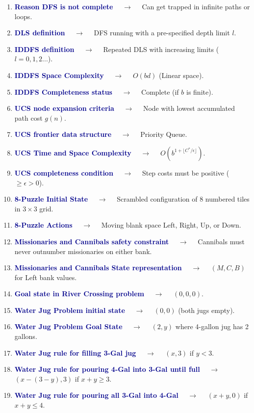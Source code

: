 \documentclass[11pt,a4paper]{article}
\begin{document}
\begin{enumerate}[label=\arabic*., leftmargin=*, labelsep=0.8em, itemsep=0.35em, parsep=0.1em, topsep=0.2em]
  \item \textcolor{darkblue}{\textbf{Reason DFS is not complete}} $\quad\to\quad$ Can get trapped in infinite paths or loops.
  \item \textcolor{darkblue}{\textbf{DLS definition}} $\quad\to\quad$ DFS running with a pre-specified depth limit $l$.
  \item \textcolor{darkblue}{\textbf{IDDFS definition}} $\quad\to\quad$ Repeated DLS with increasing limits ($l = 0, 1, 2...$).
  \item \textcolor{darkblue}{\textbf{IDDFS Space Complexity}} $\quad\to\quad$ $O(bd)$ (Linear space).
  \item \textcolor{darkblue}{\textbf{IDDFS Completeness status}} $\quad\to\quad$ Complete (if $b$ is finite).
  \item \textcolor{darkblue}{\textbf{UCS node expansion criteria}} $\quad\to\quad$ Node with lowest accumulated path cost $g(n)$.
  \item \textcolor{darkblue}{\textbf{UCS frontier data structure}} $\quad\to\quad$ Priority Queue.
  \item \textcolor{darkblue}{\textbf{UCS Time and Space Complexity}} $\quad\to\quad$ $O(b^{1 + \lfloor C^*/\epsilon \rfloor})$.
  \item \textcolor{darkblue}{\textbf{UCS completeness condition}} $\quad\to\quad$ Step costs must be positive ($\ge \epsilon > 0$).
  \item \textcolor{darkblue}{\textbf{8-Puzzle Initial State}} $\quad\to\quad$ Scrambled configuration of 8 numbered tiles in $3\times3$ grid.
  \item \textcolor{darkblue}{\textbf{8-Puzzle Actions}} $\quad\to\quad$ Moving blank space Left, Right, Up, or Down.
  \item \textcolor{darkblue}{\textbf{Missionaries and Cannibals safety constraint}} $\quad\to\quad$ Cannibals must never outnumber missionaries on either bank.
  \item \textcolor{darkblue}{\textbf{Missionaries and Cannibals State representation}} $\quad\to\quad$ $(M, C, B)$ for Left bank values.
  \item \textcolor{darkblue}{\textbf{Goal state in River Crossing problem}} $\quad\to\quad$ $(0, 0, 0)$.
  \item \textcolor{darkblue}{\textbf{Water Jug Problem initial state}} $\quad\to\quad$ $(0, 0)$ (both jugs empty).
  \item \textcolor{darkblue}{\textbf{Water Jug Problem Goal State}} $\quad\to\quad$ $(2, y)$ where 4-gallon jug has 2 gallons.
  \item \textcolor{darkblue}{\textbf{Water Jug rule for filling 3-Gal jug}} $\quad\to\quad$ $(x, 3)$ if $y < 3$.
  \item \textcolor{darkblue}{\textbf{Water Jug rule for pouring 4-Gal into 3-Gal until full}} $\quad\to\quad$ $(x - (3 - y), 3)$ if $x+y \ge 3$.
  \item \textcolor{darkblue}{\textbf{Water Jug rule for pouring all 3-Gal into 4-Gal}} $\quad\to\quad$ $(x+y, 0)$ if $x+y \le 4$.
\end{enumerate}
\end{document}
